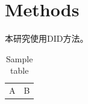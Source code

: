 \section{Methods}
本研究使用DID方法。

\begin{table}
	\caption{Sample table}
	\begin{tabular}{cc}
		A & B \\
	\end{tabular}
\end{table}
